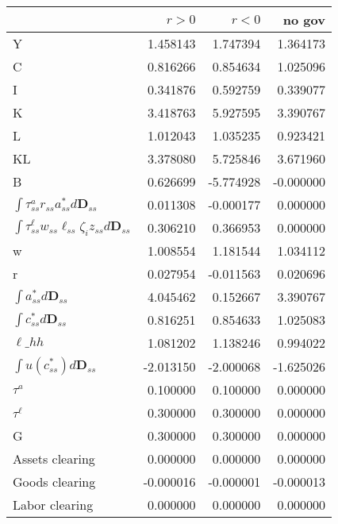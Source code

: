 \begin{tabular}{lrrr}
\toprule
 & $r>0$ & $r<0$ & no gov \\
\midrule
Y & 1.458143 & 1.747394 & 1.364173 \\
C & 0.816266 & 0.854634 & 1.025096 \\
I & 0.341876 & 0.592759 & 0.339077 \\
K & 3.418763 & 5.927595 & 3.390767 \\
L & 1.012043 & 1.035235 & 0.923421 \\
KL & 3.378080 & 5.725846 & 3.671960 \\
B & 0.626699 & -5.774928 & -0.000000 \\
$\int \tau^{a}_{ss}r_{ss}a^{*}_{ss}d\mathbf{D}_{ss}$ & 0.011308 & -0.000177 & 0.000000 \\
$\int \tau^{\ell}_{ss}w_{ss}\ell_{ss}\zeta_{i}z_{ss}d\mathbf{D}_{ss}$ & 0.306210 & 0.366953 & 0.000000 \\
w & 1.008554 & 1.181544 & 1.034112 \\
r & 0.027954 & -0.011563 & 0.020696 \\
$\int a^{*}_{ss} d\mathbf{D}_{ss}$ & 4.045462 & 0.152667 & 3.390767 \\
$\int c^{*}_{ss} d\mathbf{D}_{ss}$ & 0.816251 & 0.854633 & 1.025083 \\
$\ell\_hh$ & 1.081202 & 1.138246 & 0.994022 \\
$\int u \left(c^{*}_{ss} \right) d\mathbf{D}_{ss}$ & -2.013150 & -2.000068 & -1.625026 \\
$\tau^{a}$ & 0.100000 & 0.100000 & 0.000000 \\
$\tau^{\ell}$ & 0.300000 & 0.300000 & 0.000000 \\
G & 0.300000 & 0.300000 & 0.000000 \\
Assets clearing & 0.000000 & 0.000000 & 0.000000 \\
Goods clearing & -0.000016 & -0.000001 & -0.000013 \\
Labor clearing & 0.000000 & 0.000000 & 0.000000 \\
\bottomrule
\end{tabular}
